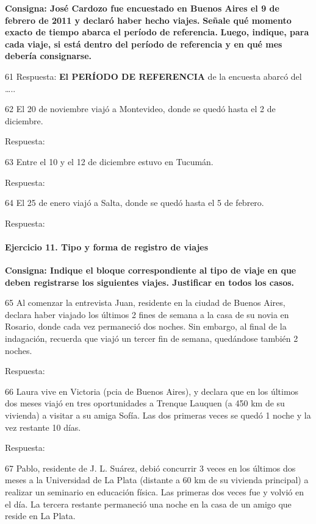 \documentclass[
  openany]{book}
\begin{document}
\textbf{Consigna: José Cardozo fue encuestado en Buenos Aires el 9 de febrero de 2011 y declaró haber hecho viajes.} \textbf{Señale qué momento exacto de tiempo abarca el período de referencia.} \textbf{Luego, indique, para cada viaje, si está dentro del período de referencia y en qué mes debería consignarse.}

61 Respuesta: \textbf{El PERÍODO DE REFERENCIA} de la encuesta abarcó del \ldots..

62 El 20 de noviembre viajó a Montevideo, donde se quedó hasta el 2 de diciembre.

Respuesta:

63 Entre el 10 y el 12 de diciembre estuvo en Tucumán.

Respuesta:

64 El 25 de enero viajó a Salta, donde se quedó hasta el 5 de febrero.

Respuesta:

\hypertarget{ejercicio-11.-tipo-y-forma-de-registro-de-viajes}{%
\paragraph{Ejercicio 11. Tipo y forma de registro de viajes}\label{ejercicio-11.-tipo-y-forma-de-registro-de-viajes}}

\textbf{Consigna: Indique el bloque correspondiente al tipo de viaje en que deben registrarse los siguientes viajes. Justificar en todos los casos.}

65 Al comenzar la entrevista Juan, residente en la ciudad de Buenos Aires, declara haber viajado los últimos 2 fines de semana a la casa de su novia en Rosario, donde cada vez permaneció dos noches. Sin embargo, al final de la indagación, recuerda que viajó un tercer fin de semana, quedándose también 2 noches.

Respuesta:

66 Laura vive en Victoria (pcia de Buenos Aires), y declara que en los últimos dos meses viajó en tres oportunidades a Trenque Lauquen (a 450 km de su vivienda) a visitar a su amiga Sofía. Las dos primeras veces se quedó 1 noche y la vez restante 10 días.

Respuesta:

67 Pablo, residente de J. L. Suárez, debió concurrir 3 veces en los últimos dos meses a la Universidad de La Plata (distante a 60 km de su vivienda principal) a realizar un seminario en educación física. Las primeras dos veces fue y volvió en el día. La tercera restante permaneció una noche en la casa de un amigo que reside en La Plata.
\end{document}
